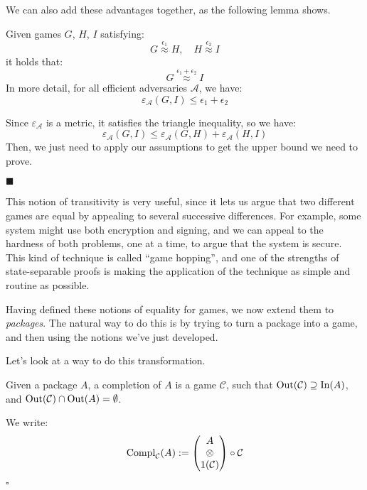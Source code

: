 We can also add these advantages together, as the following
lemma shows.

\begin{lemma}
    Given games $G$, $H$, $I$ satisfying:
    $$
    G \overset{\epsilon_1}{\approx} H, \quad H \overset{\epsilon_2}{\approx} I
    $$
    it holds that:
    $$
    G \overset{\epsilon_1 + \epsilon_2}{\approx} I
    $$
    In more detail, for all efficient adversaries $\mathcal{A}$, we have:
    $$
    \varepsilon_{\mathcal{A}}(G, I) \leq \epsilon_1 + \epsilon_2
    $$

     Since $\varepsilon_{\mathcal{A}}$ is a metric, it
    satisfies the triangle inequality, so we have:
    $$
    \varepsilon_{\mathcal{A}}(G, I) \leq \varepsilon_{\mathcal{A}}(G, H) + \varepsilon_{\mathcal{A}}(H, I)
    $$
    Then, we just need to apply our assumptions to get the upper bound we 
    need to prove.

    $\blacksquare$
\end{lemma}

This notion of transitivity is very useful, since it lets us argue
that two different games are equal by appealing to several successive
differences.
For example, some system might use both encryption and signing,
and we can appeal to the hardness of both problems, one at a time,
to argue that the system is secure.
This kind of technique is called ``game hopping'',
and one of the strengths of state-separable proofs is making
the application of the technique as simple and routine as possible.

Having defined these notions of equality for games,
we now extend them to \emph{packages}.
The natural way to do this is by trying to turn
a package into a game, and then using the notions we've just developed.

Let's look at a way to do this transformation.

\begin{definition}[Completion]
    Given a package $A$, a completion of $A$ is a game $\mathcal{C}$,
    such that $\text{Out}(\mathcal{C}) \supseteq \text{In}(A)$,
    and $\text{Out}(\mathcal{C}) \cap \text{Out}(A) = \emptyset$.

    We write:
    $$
    \text{Compl}_{\mathcal{C}}(A) := \begin{pmatrix}
        A\cr
        \otimes\cr
        1(\mathcal{C})
    \end{pmatrix}
    \circ \mathcal{C}
    $$

    $\square$
\end{definition}


